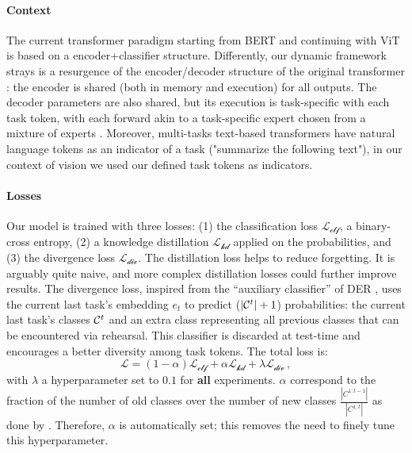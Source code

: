 \paragraph{Context} The current transformer paradigm starting from BERT \citep{devlin2018bert} and
continuing with ViT \citep{dosovitskiy2020vit} is based on a encoder+classifier structure.
Differently, our dynamic framework strays is a resurgence of the encoder/decoder structure of the
original transformer \citep{vaswani2017transformer}: the encoder is shared (both in memory and
execution) for all outputs. The decoder parameters are also shared, but its execution is
task-specific with each task token, with each forward akin to a task-specific expert chosen from a
mixture of experts \citep{masoudnia2014mixture}. Moreover, multi-tasks text-based transformers have
natural language tokens as an indicator of a task \citep{raffel2019t5} (\eg "summarize the
following text"), in our context of vision we used our defined task tokens as indicators.

\label{sec:dytox_training}

\paragraph{Losses} Our model is trained with three losses: (1) the classification loss
$\mathcal{L_\text{clf}}$, a binary-cross entropy, (2) a knowledge distillation
\citep{hinton2015knowledge_distillation} $\mathcal{L_\text{kd}}$ applied on the probabilities, and
(3) the divergence loss $\mathcal{L_\text{div}}$. The distillation loss helps to reduce forgetting.
It is arguably quite naive, and more complex distillation losses
\citep{selvaraju2017gradcam,hou2019ucir} could further improve results. The
divergence loss, inspired from the ``auxiliary classifier'' of DER \citep{yan2021der}, uses the
current last task's embedding $e_t$ to predict ($|\mathcal{C}^t| + 1$) probabilities: the current last
task's classes $\mathcal{C}^t$ and an extra class representing all previous classes that can be encountered
via rehearsal. This classifier is discarded at test-time and encourages a better diversity among
task tokens. The total loss is:
%
\begin{equation}
    \mathcal{L} = (1 - \alpha) \mathcal{L_\text{clf}} + \alpha \mathcal{L_\text{kd}} + \lambda \mathcal{L_\text{div}}\,,
    \label{eq:dytox_final_loss}
\end{equation}
%
with $\lambda$ a hyperparameter set to $0.1$ for \textbf{all} experiments. $\alpha$ correspond to
the fraction of the number of old classes over the number of new classes
$\frac{|C^{1:t-1}|}{|C^{1:t}|}$ as done by \citet{zhao2020weightalignement}. Therefore, $\alpha$ is
automatically set; this removes the need to finely tune this hyperparameter.


